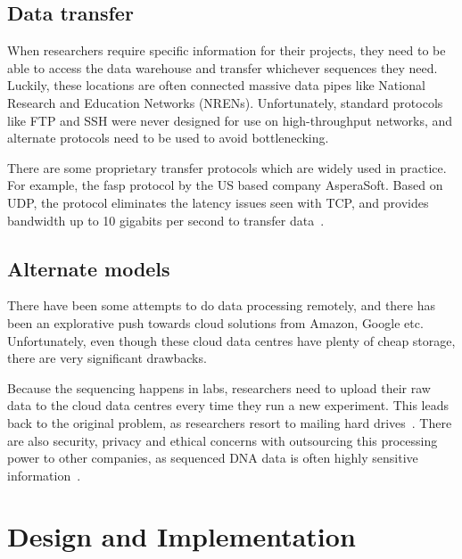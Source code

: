 \documentclass{sig-alternate-05-2015}
\begin{document}
\subsection{Data transfer}
When researchers require specific information for their projects, they need to be able to access the data warehouse and transfer whichever sequences they need. Luckily, these locations are often connected massive data pipes like National Research and Education Networks (NRENs). Unfortunately, standard protocols like FTP and SSH were never designed for use on high-throughput networks, and alternate protocols need to be used to avoid bottlenecking.

There are some proprietary transfer protocols which are widely used in practice. For example, the fasp protocol by the US based company AsperaSoft. Based on UDP, the protocol eliminates the latency issues seen with TCP, and provides bandwidth up to 10 gigabits per second to transfer data~\cite{beloslyudtsev2014aspera}.

\subsection{Alternate models}
There have been some attempts to do data processing remotely, and there has been an explorative push towards cloud solutions from Amazon, Google etc. Unfortunately, even though these cloud data centres have plenty of cheap storage, there are very significant drawbacks.

Because the sequencing happens in labs, researchers need to upload their raw data to the cloud data centres every time they run a new experiment. This leads back to the original problem, as researchers resort to mailing hard drives~\cite{baker2010next}.
There are also security, privacy and ethical concerns with outsourcing this processing power to other companies, as sequenced DNA data is often highly sensitive information~\cite{marx2013biology}.

\section{Design and Implementation}
\end{document}
